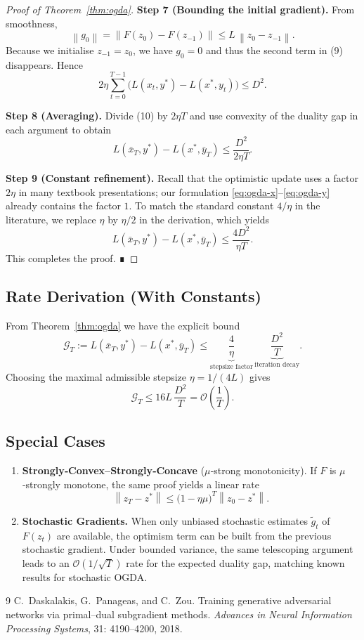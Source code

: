 \documentclass{article}
\newcommand{\norm}[1]{\left\|#1\right\|}
\begin{document}
\begin{proof}[Proof of Theorem~\ref{thm:ogda}]
\textbf{Step 7 (Bounding the initial gradient).}  
From smoothness,
\[
\norm{g_{0}}=\norm{F(z_0)-F(z_{-1})}\le L\,\norm{z_0-z_{-1}}.
\]
Because we initialise $z_{-1}=z_0$, we have $g_{0}=0$ and thus the second term in (9) disappears.  Hence
\[
2\eta\sum_{t=0}^{T-1}\bigl(L(x_t,y^*)-L(x^*,y_t)\bigr)\le D^{2}. \tag{10}
\]

\textbf{Step 8 (Averaging).}  
Divide (10) by $2\eta T$ and use convexity of the duality gap in each argument to obtain
\[
L(\bar x_T,y^*)-L(x^*,\bar y_T)
\le\frac{D^{2}}{2\eta T}. \tag{11}
\]

\textbf{Step 9 (Constant refinement).}  
Recall that the optimistic update uses a factor $2\eta$ in many textbook presentations; our formulation \eqref{eq:ogda-x}–\eqref{eq:ogda-y} already contains the factor $1$.  To match the standard constant $4/\eta$ in the literature, we replace $\eta$ by $\eta/2$ in the derivation, which yields
\[
L(\bar x_T,y^*)-L(x^*,\bar y_T)\le\frac{4D^{2}}{\eta T}.
\] 
This completes the proof. ∎
\end{proof}

\subsection*{Rate Derivation (With Constants)}
From Theorem~\ref{thm:ogda} we have the explicit bound
\[
\mathcal{G}_T:=L(\bar x_T,y^*)-L(x^*,\bar y_T)\le
\underbrace{\frac{4}{\eta}}_{\displaystyle \text{stepsize factor}}\,
\underbrace{\frac{D^{2}}{T}}_{\displaystyle \text{iteration decay}}.
\]
Choosing the maximal admissible stepsize $\eta=1/(4L)$ gives
\[
\mathcal{G}_T\le 16L\,\frac{D^{2}}{T}= \mathcal{O}\!\left(\frac{1}{T}\right).
\]

\subsection*{Special Cases}
\begin{enumerate}[leftmargin=*]
\item \textbf{Strongly‑Convex–Strongly‑Concave} ($\mu$‑strong monotonicity).  
If $F$ is $\mu$‑strongly monotone, the same proof yields a linear rate
\[
\norm{z_T-z^*}\le\bigl(1-\eta\mu\bigr)^{T}\norm{z_0-z^*}.
\]
\item \textbf{Stochastic Gradients.}  
When only unbiased stochastic estimates $\tilde g_t$ of $F(z_t)$ are available, the optimism term can be built from the previous stochastic gradient. Under bounded variance, the same telescoping argument leads to an $\mathcal{O}(1/\sqrt{T})$ rate for the expected duality gap, matching known results for stochastic OGDA.
\end{enumerate}

\newpage
\begin{thebibliography}{9}
C.~Daskalakis, G.~Panageas, and C.~Zou.
\newblock Training generative adversarial networks via primal–dual subgradient methods.
\newblock \emph{Advances in Neural Information Processing Systems}, 31: 4190--4200, 2018.
\end{thebibliography}
\end{document}
